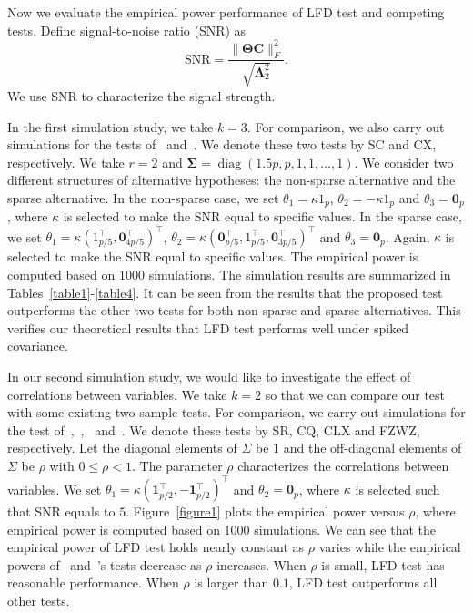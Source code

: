 \documentclass[12pt]{article} %
\DeclareMathOperator{\mydiag}{diag}
\newcommand{\bC}{\mathbf{C}}
\newcommand{\bfsym}[1]{\ensuremath{\boldsymbol{#1}}}
\def\bLambda {\bfsym {\Lambda}}
\def\bSigma {\bfsym {\Sigma}}
\def\bTheta {\bfsym {\Theta}}
\theoremstyle{definition}
\begin{document}
   
   
   



Now we evaluate the empirical power performance of LFD test and competing tests.
Define signal-to-noise ratio (SNR) as
$$
\textrm{SNR}=\frac{\|\bTheta\bC\|_F^2}{\sqrt{\bLambda_2^2}}.
$$
We use SNR to characterize the signal strength.

In the first simulation study, we take $k=3$.
For comparison, we also carry out simulations for the tests of~\citet{Schott2007Some} and~\citet{Cai2014High}.
We denote these two tests by  SC and  CX, respectively.
We take $r=2$ and $\bSigma=\mydiag(1.5p,p,1,1,\ldots,1)$.
We consider two different structures of alternative hypotheses: the non-sparse alternative and the sparse alternative.
In the non-sparse case, we set $\theta_1=\kappa 1_p$, $\theta_2=-\kappa 1_p$ and $\theta_3=\mathbf{0}_p$, where $\kappa$ is selected to make the SNR equal to specific values.
In the sparse case, we set $\theta_1=\kappa (1_{p/5}^\top,\mathbf{0}_{4p/5}^\top)^\top$, $\theta_2=\kappa (\mathbf{0}_{p/5}^\top, 1_{p/5}^\top,\mathbf{0}_{3p/5}^\top)^\top$ and $\theta_3=\mathbf{0}_p$.
Again, $\kappa$ is selected to make the SNR equal to specific values.
The empirical power is computed based on $1000$ simulations.
The simulation results are summarized in Tables~\ref{table1}-\ref{table4}. It can be seen from the results that the proposed test outperforms the other two tests for both non-sparse and sparse alternatives.
This verifies our theoretical results that LFD test performs well under spiked covariance.

In our second simulation study, we would like to investigate the effect of correlations between variables.
We take $k=2$ so that we can compare our test with some existing two sample tests.
For comparison, we carry out simulations for the test of~\cite{Srivastava2007Multivariate},~\cite{Chen2010A},~\cite{Tony2013} and~\cite{Feng2014Two}.
We denote these tests by SR, CQ, CLX and FZWZ, respectively.
Let the diagonal elements of $\Sigma$ be $1$ and the off-diagonal elements of $\Sigma$ be $\rho$ with $0\leq \rho<1$.
The parameter $\rho$ characterizes the correlations between variables.
We set $\theta_1=\kappa (\textbf{1}_{p/2}^\top,-\textbf{1}_{p/2}^\top)^\top$ and $\theta_2=\mathbf{0}_p$, where $\kappa$ is selected such that SNR equals to $5$.
Figure~\ref{figure1} plots the empirical power versus $\rho$, where empirical power is computed based on 1000 simulations.
We can see that the empirical power of LFD test holds nearly constant as $\rho$ varies while the empirical powers of~\cite{Chen2010A} and~\cite{Feng2014Two}'s tests decrease as $\rho$ increases.
When $\rho$ is small,  LFD test has reasonable performance. When $\rho$ is larger than $0.1$, LFD test outperforms all other tests.
\end{document}
